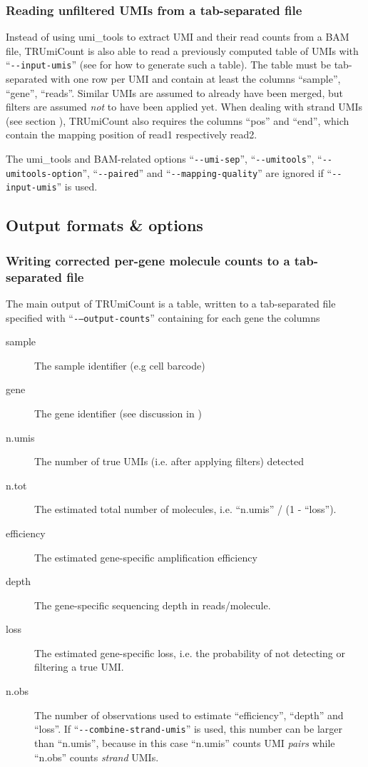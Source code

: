 \documentclass[10pt]{article}
\makeatletter
\newcommand{\ddarg}[1]{\texttt{-{}-#1}}
\DeclareRobustCommand*{\nameref}[1]{%
      \textit{\my@nameref{#1}}%
    }%
\makeatother
\begin{document}
\subsubsection*{Reading unfiltered UMIs from a tab-separated file}

Instead of using umi\_tools to extract UMI and their read counts from a BAM file, TRUmiCount is also able to read a previously computed table of UMIs with ``\ddarg{input-umis}'' (see \nameref{output-options} for how to generate such a table). The table must be tab-separated with one row per UMI and contain at least the columns ``sample'', ``gene'', ``reads''. Similar UMIs are assumed to already have been merged, but filters are assumed \emph{not} to have been applied yet. When dealing with strand UMIs (see section \nameref{strand-umis}), TRUmiCount also requires the columns ``pos'' and ``end'', which contain the mapping position of read1 respectively read2.

\begin{sloppypar}
The umi\_tools and BAM-related options ``\ddarg{umi-sep}'', ``\ddarg{umitools}'', ``\ddarg{umitools-option}'', ``\ddarg{paired}'' and ``\ddarg{mapping-quality}'' are ignored if ``\ddarg{input-umis}'' is used.
\end{sloppypar}

\subsection{Output formats \& options}\label{output-options}

\subsubsection*{Writing corrected per-gene molecule counts to a tab-separated file}

The main output of TRUmiCount is a table, written to a tab-separated file specified with ``\ddarg{--output-counts}'' containing for each gene the columns
\begin{description}
\item[sample] The sample identifier (e.g cell barcode)
\item[gene] The gene identifier (see discussion in \nameref{input-bam})
\item[n.umis] The number of true UMIs (i.e. after applying filters) detected
\item[n.tot] The estimated total number of molecules, i.e. ``n.umis'' / (1 - ``loss'').
\item[efficiency] The estimated gene-specific amplification efficiency
\item[depth] The gene-specific sequencing depth in reads/molecule.
\item[loss] The estimated gene-specific loss, i.e. the probability of not detecting or filtering a true UMI. 
\item[n.obs] The number of observations used to estimate ``efficiency'', ``depth'' and ``loss''. If ``\ddarg{combine-strand-umis}'' is used, this number can be larger than ``n.umis'', because in this case ``n.umis'' counts UMI \emph{pairs} while ``n.obs'' counts \emph{strand} UMIs.
\end{description}
\end{document}
